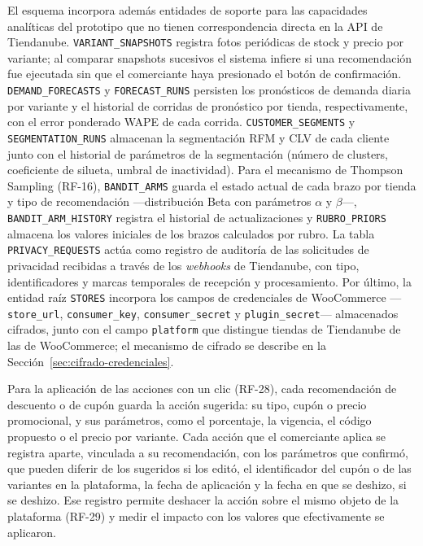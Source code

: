 El esquema incorpora además entidades de soporte para las capacidades analíticas del prototipo que no tienen correspondencia directa en la API de Tiendanube. \texttt{VARIANT\_SNAPSHOTS} registra fotos periódicas de stock y precio por variante; al comparar snapshots sucesivos el sistema infiere si una recomendación fue ejecutada sin que el comerciante haya presionado el botón de confirmación. \texttt{DEMAND\_FORECASTS} y \texttt{FORECAST\_RUNS} persisten los pronósticos de demanda diaria por variante y el historial de corridas de pronóstico por tienda, respectivamente, con el error ponderado WAPE de cada corrida. \texttt{CUSTOMER\_SEGMENTS} y \texttt{SEGMENTATION\_RUNS} almacenan la segmentación RFM y CLV de cada cliente junto con el historial de parámetros de la segmentación (número de clusters, coeficiente de silueta, umbral de inactividad). Para el mecanismo de Thompson Sampling (RF-16), \texttt{BANDIT\_ARMS} guarda el estado actual de cada brazo por tienda y tipo de recomendación ---distribución Beta con parámetros $\alpha$ y $\beta$---, \texttt{BANDIT\_ARM\_HISTORY} registra el historial de actualizaciones y \texttt{RUBRO\_PRIORS} almacena los valores iniciales de los brazos calculados por rubro. La tabla \texttt{PRIVACY\_REQUESTS} actúa como registro de auditoría de las solicitudes de privacidad recibidas a través de los \emph{webhooks} de Tiendanube, con tipo, identificadores y marcas temporales de recepción y procesamiento. Por último, la entidad raíz \texttt{STORES} incorpora los campos de credenciales de WooCommerce ---\texttt{store\_url}, \texttt{consumer\_key}, \texttt{consumer\_secret} y \texttt{plugin\_secret}--- almacenados cifrados, junto con el campo \texttt{platform} que distingue tiendas de Tiendanube de las de WooCommerce; el mecanismo de cifrado se describe en la Sección~\ref{sec:cifrado-credenciales}.

Para la aplicación de las acciones con un clic (RF-28), cada recomendación de descuento o de cupón guarda la acción sugerida: su tipo, cupón o precio promocional, y sus parámetros, como el porcentaje, la vigencia, el código propuesto o el precio por variante. Cada acción que el comerciante aplica se registra aparte, vinculada a su recomendación, con los parámetros que confirmó, que pueden diferir de los sugeridos si los editó, el identificador del cupón o de las variantes en la plataforma, la fecha de aplicación y la fecha en que se deshizo, si se deshizo. Ese registro permite deshacer la acción sobre el mismo objeto de la plataforma (RF-29) y medir el impacto con los valores que efectivamente se aplicaron.

